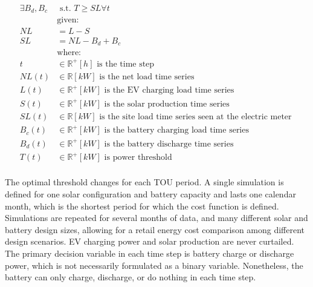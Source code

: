 \documentclass[journal,article,submit,pdftex,moreauthors]{Definitions/mdpi}
\begin{document}
  \begin{equation}
    \label{eq:net-load}
    \begin{split}
      \exists B_d, B_c &\text{ s.t. } T \ge SL \forall t                                    \\      
             & \text{given:}                                                                        \\
      NL     & = L - S                                                                              \\
      SL     & = NL - B_d + B_c                                                                     \\
             & \text{where:}                                                                        \\
      t      & \in \mathbb{R}^+ [h] \text{ is the time step }      \\             
      NL(t)  & \in \mathbb{R} [kW] \text{ is the net load time series }                             \\
      L(t)   & \in \mathbb{R}^+ [kW] \text{ is the EV charging load time series }                   \\
      S(t)   & \in \mathbb{R}^+ [kW] \text{ is the solar production time series }                   \\
      SL(t)  & \in \mathbb{R} [kW] \text{ is the site load time series seen at the electric meter } \\
      B_c(t) & \in \mathbb{R}^+ [kW] \text{ is the battery charging load time series }              \\
      B_d(t) & \in \mathbb{R}^+ [kW] \text{ is the battery discharge time series }                  \\
      T(t)   & \in \mathbb{R}^+ [kW] \text{ is power threshold }                                    \\
    \end{split}
  \end{equation}

  The optimal threshold changes for each TOU period. A single simulation is defined for one solar configuration and battery capacity and lasts one calendar month, which is the shortest period for which the cost function is defined. Simulations are repeated for several months of data, and many different solar and battery design sizes, allowing for a retail energy cost comparison among different design scenarios. EV charging power and solar production are never curtailed. The primary decision variable in each time step is battery charge or discharge power, which is not necessarily formulated as a binary variable. Nonetheless, the battery can only charge, discharge, or do nothing in each time step.
\end{document}
